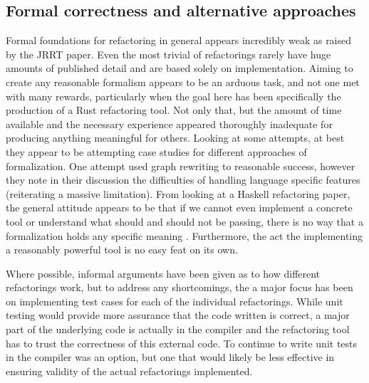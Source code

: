 
\subsection{Formal correctness and alternative approaches}
Formal foundations for refactoring in general appears incredibly weak as raised by the JRRT paper. Even the most trivial of refactorings rarely have huge amounts of published detail and are based solely on implementation. Aiming to create any reasonable formalism appears to be an arduous task, and not one met with many rewards, particularly when the goal here has been specifically the production of a Rust refactoring tool. Not only that, but the amount of time available and the necessary experience appeared thoroughly inadequate for producing anything meaningful for others. Looking at some attempts, at best they appear to be attempting case studies for different approaches of formalization. One attempt used graph rewriting \cite{graph} to reasonable success, however they note in their discussion the difficulties of handling language specific features (reiterating a massive limitation). From looking at a Haskell refactoring paper, the general attitude appears to be that if we cannot even implement a concrete tool or understand what should and should not be passing, there is no way that a formalization holds any specific meaning \cite{sculthorpe}. Furthermore, the act the implementing a reasonably powerful tool is no easy feat on its own. 


Where possible, informal arguments have been given as to how different refactorings work, but to address any shortcomings, the a major focus has been on implementing test cases for each of the individual refactorings. While unit testing would provide more assurance that the code written is correct, a major part of the underlying code is actually in the compiler and the refactoring tool has to trust the correctness of this external code. To continue to write unit tests in the compiler was an option, but one that would likely be less effective in ensuring validity of the actual refactorings implemented. 

